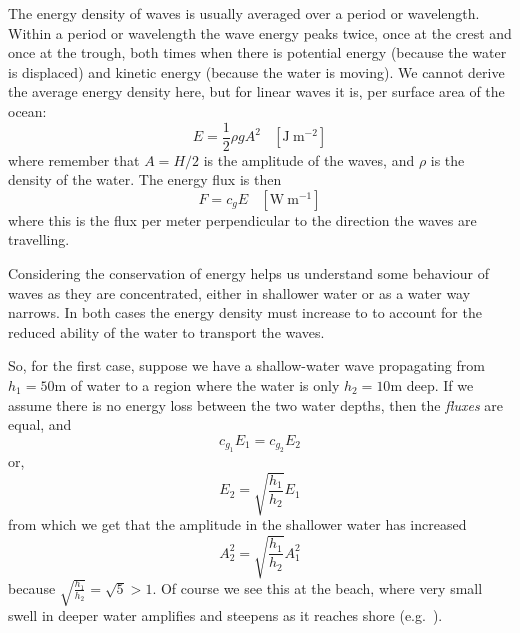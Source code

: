 The energy density of waves is usually averaged over a period or wavelength.  Within a period or wavelength the wave energy peaks twice, once at the crest and once at the trough, both times when there is potential energy (because the water is displaced) and kinetic energy (because the water is moving).  We cannot derive the average energy density here, but for linear waves it is, per surface area of the ocean:
\begin{equation}
  E = \frac{1}{2} \rho g A^2  \ \ \ \ \mathrm{[J\ m^{-2}]}
\end{equation}
where remember that $A=H/2$ is the amplitude of the waves, and $\rho$ is the density of the water.  The energy flux is then 
\begin{equation}
  F = c_g E \ \ \ \ \mathrm{[W\ m^{-1}]}
\end{equation}
where this is the flux per meter perpendicular to the direction the waves are travelling.  

Considering the conservation of energy helps us understand some behaviour of waves as they are concentrated, either in shallower water or as a water way narrows.  In both cases the energy density must increase to to account for the reduced ability of the water to transport the waves.  

So, for the first case, suppose we have a shallow-water wave propagating from  $h_1 = 50 \mathrm{m}$ of water to a region where the water is only $h_2=10 \mathrm{m}$ deep.  If we assume there is no energy loss between the two water depths, then the \emph{fluxes} are equal, and 
\begin{equation}
     c_{g_1} E_1 = c_{g_2} E_2
\end{equation}
or,
\begin{equation}
    E_2 = \sqrt{\frac{h_1}{h_2}} E_1
\end{equation}
from which we get that the amplitude in the shallower water has increased
\begin{equation}
  A_2^2 = \sqrt{\frac{h_1}{h_2}} A_1^2
\end{equation}
because $\sqrt{\frac{h_1}{h_2}}  = \sqrt{5} > 1$.  Of course we see this at the beach, where very small swell in deeper water amplifies and steepens as it reaches shore (e.g.\ ). 

